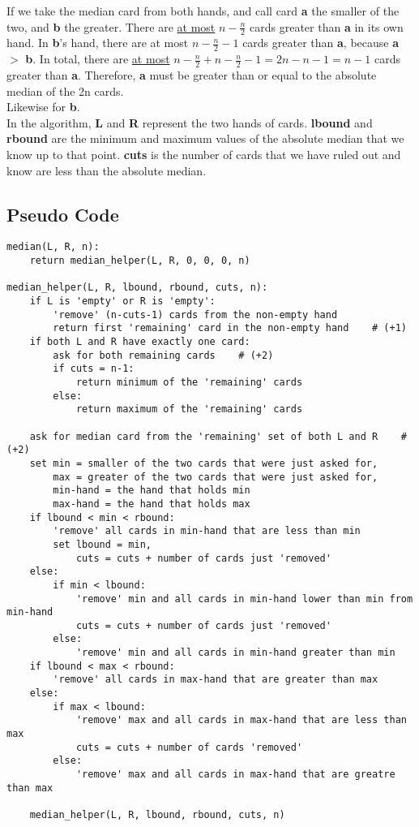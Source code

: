 \documentclass[a4paper,12pt]{article}
\begin{document}
\noindent If we take the median card from both hands, and call card {\bf a} the smaller of the two, and {\bf b} the 
greater. There are \underline{at most} \(n - \frac{n}{2}\) cards greater than {\bf a} in its own hand. In {\bf b}'s 
hand, there are at most \(n - \frac{n}{2} - 1\) cards greater than {\bf a}, because {\bf a} \(>\) {\bf b}. In total,
there are \underline{at most} \( n - \frac{n}{2} + n - \frac{n}{2} - 1 = 2n - n - 1 = n - 1\) cards greater
than {\bf a}. Therefore, {\bf a} must be greater than or equal to the absolute median of the 2n cards.\\

\noindent Likewise for {\bf b}.\\

\noindent In the algorithm, {\bf L} and {\bf R} represent the two hands of cards. {\bf lbound} and {\bf rbound}
are the minimum and maximum values of the absolute median that we know up to that point. {\bf cuts} is the number of cards that we have ruled out and know are less than the absolute median.\\

\subsection*{Pseudo Code}
\begin{lstlisting}
median(L, R, n):
    return median_helper(L, R, 0, 0, 0, n)

median_helper(L, R, lbound, rbound, cuts, n):
    if L is 'empty' or R is 'empty':
        'remove' (n-cuts-1) cards from the non-empty hand
        return first 'remaining' card in the non-empty hand    # (+1)
    if both L and R have exactly one card:
        ask for both remaining cards    # (+2)
        if cuts = n-1:
            return minimum of the 'remaining' cards
        else:
            return maximum of the 'remaining' cards

    ask for median card from the 'remaining' set of both L and R    # (+2)
    set min = smaller of the two cards that were just asked for,
        max = greater of the two cards that were just asked for,
        min-hand = the hand that holds min
        max-hand = the hand that holds max
    if lbound < min < rbound:
        'remove' all cards in min-hand that are less than min
        set lbound = min,
            cuts = cuts + number of cards just 'removed'
    else:
        if min < lbound:
            'remove' min and all cards in min-hand lower than min from min-hand
            cuts = cuts + number of cards just 'removed'
        else:
            'remove' min and all cards in min-hand greater than min
    if lbound < max < rbound:
        'remove' all cards in max-hand that are greater than max
    else:
        if max < lbound:
            'remove' max and all cards in max-hand that are less than max
            cuts = cuts + number of cards 'removed'
        else:
            'remove' max and all cards in max-hand that are greatre than max

    median_helper(L, R, lbound, rbound, cuts, n)

\end{lstlisting}
\end{document}
